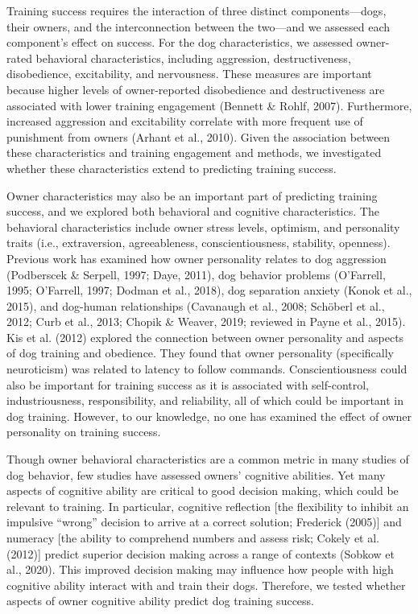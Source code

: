 \documentclass[
  english,
  ,pub,floatsintext]{apa6}
\begin{document}
Training success requires the interaction of three distinct components---dogs, their owners, and the interconnection between the two---and we assessed each component's effect on success. For the dog characteristics, we assessed owner-rated behavioral characteristics, including aggression, destructiveness, disobedience, excitability, and nervousness. These measures are important because higher levels of owner-reported disobedience and destructiveness are associated with lower training engagement (Bennett \& Rohlf, 2007). Furthermore, increased aggression and excitability correlate with more frequent use of punishment from owners (Arhant et al., 2010). Given the association between these characteristics and training engagement and methods, we investigated whether these characteristics extend to predicting training success.

Owner characteristics may also be an important part of predicting training success, and we explored both behavioral and cognitive characteristics. The behavioral characteristics include owner stress levels, optimism, and personality traits (i.e., extraversion, agreeableness, conscientiousness, stability, openness). Previous work has examined how owner personality relates to dog aggression (Podberscek \& Serpell, 1997; Daye, 2011), dog behavior problems (O'Farrell, 1995; O'Farrell, 1997; Dodman et al., 2018), dog separation anxiety (Konok et al., 2015), and dog-human relationships (Cavanaugh et al., 2008; Schöberl et al., 2012; Curb et al., 2013; Chopik \& Weaver, 2019; reviewed in Payne et al., 2015). Kis et al. (2012) explored the connection between owner personality and aspects of dog training and obedience. They found that owner personality (specifically neuroticism) was related to latency to follow commands. Conscientiousness could also be important for training success as it is associated with self-control, industriousness, responsibility, and reliability, all of which could be important in dog training. However, to our knowledge, no one has examined the effect of owner personality on training success.

Though owner behavioral characteristics are a common metric in many studies of dog behavior, few studies have assessed owners' cognitive abilities. Yet many aspects of cognitive ability are critical to good decision making, which could be relevant to training. In particular, cognitive reflection {[}the flexibility to inhibit an impulsive ``wrong'' decision to arrive at a correct solution; Frederick (2005){]} and numeracy {[}the ability to comprehend numbers and assess risk; Cokely et al. (2012){]} predict superior decision making across a range of contexts (Sobkow et al., 2020). This improved decision making may influence how people with high cognitive ability interact with and train their dogs. Therefore, we tested whether aspects of owner cognitive ability predict dog training success.
\end{document}
